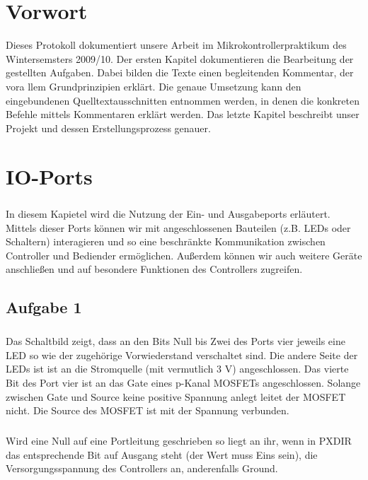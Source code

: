 \chapter{Vorwort}

Dieses Protokoll dokumentiert unsere Arbeit im Mikrokontrollerpraktikum des Wintersemsters 2009/10. Der ersten Kapitel dokumentieren die Bearbeitung der gestellten Aufgaben. Dabei bilden die Texte einen begleitenden Kommentar, der vora llem Grundprinzipien erklärt. Die genaue Umsetzung kann den eingebundenen Quelltextausschnitten entnommen werden, in denen die konkreten Befehle mittels Kommentaren erklärt werden. Das letzte Kapitel beschreibt unser Projekt und dessen Erstellungsprozess genauer.

\chapter{IO-Ports}

\paragraph*{}
In diesem Kapietel wird die Nutzung der Ein- und Ausgabeports erläutert. Mittels dieser Ports können wir mit angeschlossenen Bauteilen (z.B. LEDs oder Schaltern) interagieren und so eine beschränkte Kommunikation zwischen Controller und Bediender ermöglichen. Außerdem können wir auch weitere Geräte anschließen und auf besondere Funktionen des Controllers zugreifen.

\section*{Aufgabe 1}

\paragraph*{}
Das Schaltbild zeigt, dass an den Bits Null bis Zwei des Ports vier 
jeweils eine LED so wie der zugehörige Vorwiederstand verschaltet sind. 
Die andere Seite der LEDs ist ist an die Stromquelle (mit vermutlich 3 V) 
angeschlossen. Das vierte Bit des Port vier ist an das Gate eines p-Kanal 
MOSFETs angeschlossen. Solange zwischen Gate und Source keine positive
Spannung anlegt leitet der MOSFET nicht. Die Source des MOSFET ist mit 
der Spannung verbunden.
\paragraph*{}
Wird eine Null auf eine Portleitung geschrieben so liegt an ihr, wenn in
PXDIR das entsprechende Bit auf Ausgang steht (der Wert muss Eins sein), 
die Versorgungsspannung des Controllers an, anderenfalls Ground.
